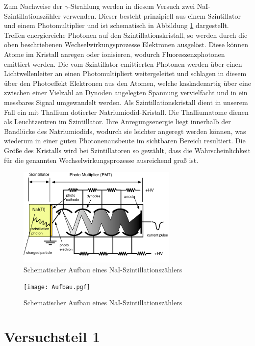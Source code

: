 \documentclass[11pt]{scrartcl}
\begin{document}
Zum Nachweise der $\gamma$-Strahlung werden in diesem Versuch zwei NaI-Szintillationszähler verwenden. Dieser besteht prinzipiell aus einem Szintillator und einem Photomultiplier und ist schematisch in Abbildung \ref{PMT} dargestellt. Treffen energiereiche Photonen auf den Szintillationskristall, so werden durch die oben beschriebenen Wechselwirkungsprozesse Elektronen ausgelöst. Diese können Atome im Kristall anregen oder ionisieren, wodurch Fluoreszenzphotonen emittiert werden. Die vom Szintillator emittierten Photonen werden über einen Lichtwellenleiter an einen Photomultipliert weitergeleitet und schlagen in diesem über den Photoeffekt Elektronen aus den Atomen, welche kaskadenartig über eine zwischen einer Vielzahl an Dynoden angelegten Spannung vervielfacht und in ein messbares Signal umgewandelt werden. Als Szintillationskristall dient in unserem Fall ein mit Thallium dotierter Natriumiodid-Kristall. Die Thalliumatome dienen als Leuchtzentren im Szintillator. Ihre Anregungsenergie liegt innerhalb der Bandlücke des Natriumiodids, wodurch sie leichter angeregt werden können, was wiederum in einer guten Photonenausbeute im sichtbaren Bereich resultiert. Die Größe des Kristalls wird bei Szintillatoren so gewählt, dass die Wahrscheinlichkeit für die genannten Wechselwirkungsprozesse ausreichend groß ist. 

\begin{figure}[htbp]  
     \includegraphics[width=0.7\textwidth]{PMT.png}
  \caption{Schematischer Aufbau eines NaI-Szintillationszählers}
  \label{PMT}
\end{figure}


\begin{figure}[htbp]  
     \texttt{[image: Aufbau.pgf]}
  \caption{Schematischer Aufbau eines NaI-Szintillationszählers}
  \label{PMT2}
\end{figure}

\section{Versuchsteil 1}
\end{document}
